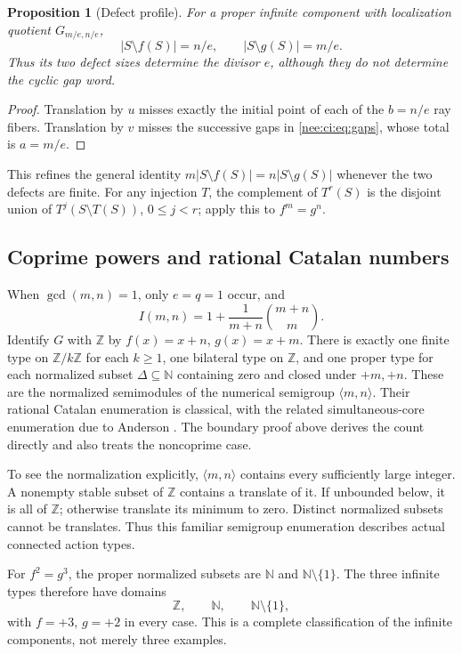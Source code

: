 \documentclass[11pt,letterpaper]{article}
\numberwithin{equation}{section}
\theoremstyle{plain}
\newtheorem{proposition}[proposition]{Proposition}
\theoremstyle{definition}
\theoremstyle{remark}
\newcommand{\NN}{\mathbb N}
\newcommand{\ZZ}{\mathbb Z}
\newcommand{\srcs}[1]{\par\noindent{\footnotesize\textit{Sources:} #1}\par}
\begin{document}
\begin{proposition}[Defect profile]\label{nee:ci:prop:defects}
For a proper infinite component with localization quotient
$G_{m/e,n/e}$,
\[
|S\setminus f(S)|=n/e,\qquad |S\setminus g(S)|=m/e.
\]
Thus its two defect sizes determine the divisor $e$,
although they do not determine the cyclic gap word.
\end{proposition}
\srcs{source~04, Proposition~6.5.}
\begin{proof}
Translation by $u$ misses exactly the initial point
of each of the $b=n/e$ ray fibers.
Translation by $v$ misses the successive gaps in
\eqref{nee:ci:eq:gaps}, whose total is $a=m/e$.
\end{proof}

This refines the general identity
$m|S\setminus f(S)|=n|S\setminus g(S)|$ whenever
the two defects are finite. For any injection $T$,
the complement of $T^r(S)$ is the disjoint union
of $T^j(S\setminus T(S))$, $0\leq j<r$;
apply this to $f^m=g^n$.

\subsection{Coprime powers and rational Catalan numbers}

When $\gcd(m,n)=1$, only $e=q=1$ occur, and
\[
I(m,n)=1+\frac1{m+n}\binom{m+n}{m}.
\]
Identify $G$ with $\ZZ$ by $f(x)=x+n$, $g(x)=x+m$. There is exactly one finite
type on $\ZZ/k\ZZ$ for each $k\geq1$, one bilateral type on $\ZZ$, and one
proper type for each normalized subset $\Delta\subseteq\NN$ containing zero
and closed under $+m,+n$. These are the normalized semimodules of the numerical
semigroup $\langle m,n\rangle$. Their rational Catalan enumeration is classical,
with the related simultaneous-core enumeration due to Anderson \cite{Anderson}.
The boundary proof above derives the count directly and also treats the
noncoprime case.

To see the normalization explicitly, $\langle m,n\rangle$ contains every
sufficiently large integer. A nonempty stable subset of $\ZZ$ contains a
translate of it. If unbounded below, it is all of $\ZZ$; otherwise translate
its minimum to zero. Distinct normalized subsets cannot be translates. Thus
this familiar semigroup enumeration describes actual connected action types.

For $f^2=g^3$, the proper normalized subsets are
$\NN$ and $\NN\setminus\{1\}$. The three infinite types therefore have domains
\[
\ZZ,\qquad\NN,\qquad\NN\setminus\{1\},
\]
with $f=+3$, $g=+2$ in every case. This is a complete classification of the
infinite components, not merely three examples.
\end{document}
